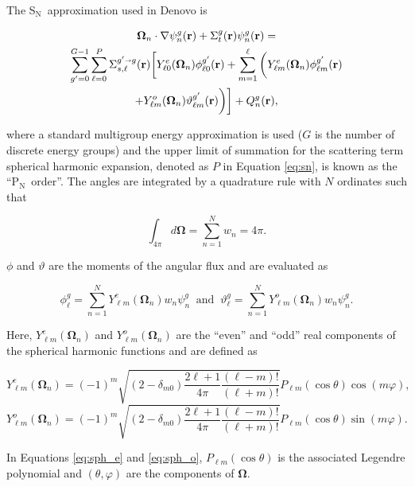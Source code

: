 \documentclass{article} %
\newcommand{\sa}{\shortrightarrow}
\newcommand{\bo}{\mathbf\Omega}
\newcommand{\vecr}{\textbf{r}}
\newcommand{\sn}{S$_\mathrm{N}$}
\newcommand{\pn}{P$_\mathrm{N}$}
\newcommand{\Ye}[2]{\ensuremath{Y^e_{#1}(\bo_#2)}}
\newcommand{\Yo}[2]{\ensuremath{Y^o_{#1}(\bo_#2)}}
\begin{document}
The \sn\ approximation used in Denovo is

\begin{multline}
\bo_n \cdot \nabla \psi_n^g(\vecr) + \Sigma_t^g(\vecr)\psi_n^g(\vecr) = \\
\sum_{g'=0}^{G-1}\sum_{\ell=0}^{P}\Sigma_{s,\ell}^{g'\sa g}(\vecr)
\bigg[\Ye{\ell 0}{n}\phi_{\ell 0}^{g'}(\vecr) + \sum_{m=1}^{\ell}
\bigg(\Ye{\ell m}{n}\phi_{\ell m}^{g'}(\vecr) \\
 + \Yo{\ell m}{n}\vartheta_{\ell m}^{g'}(\vecr)\bigg)\bigg]
+ Q_n^g(\vecr),
\label{eq:sn}
\end{multline}

\noindent where a standard multigroup energy approximation is used ($G$ is the 
number of discrete energy groups) and the 
upper limit of summation for the scattering term spherical harmonic expansion,
denoted as $P$ in Equation \ref{eq:sn}, is known as the ``\pn\ order''. The
angles are integrated by a quadrature rule with $N$ ordinates such that

\begin{equation}
\int_{4\pi} d\bo = \sum_{n=1}^{N}w_n = 4\pi.
\label{eq:quadrule}
\end{equation}

\noindent $\phi$ and $\vartheta$ are the moments of the angular flux and are
evaluated as

\begin{equation}
\phi_{\ell}^{g}=\sum_{n=1}^N \Ye{\ell m}{n}w_n\psi^{g}_{n}\
\text{ and }\
\vartheta_{\ell}^{g} = \sum_{n=1}^N \Yo{\ell m}{n}w_n\psi^{g}_{n}.
\label{sph_harm_exp}
\end{equation}

\noindent Here, $\Ye{\ell m}{n}$ and $\Yo{\ell m}{n}$ are the ``even'' and
``odd'' real components of the spherical harmonic functions and are defined as

\begin{equation}
\Ye{\ell m}{n} = (-1)^m\sqrt{(2-\delta_{m0})\frac{2\ell+1}{4\pi}
                       \frac{(\ell-m)!}{(\ell+m)!}}
                       P_{\ell m}(\cos\theta)\cos(m\varphi),
\label{eq:sph_e}
\end{equation}
\begin{equation}
\Yo{\ell m}{n} = (-1)^m\sqrt{(2-\delta_{m0})\frac{2\ell+1}{4\pi}
                       \frac{(\ell-m)!}{(\ell+m)!}}
                       P_{\ell m}(\cos\theta)\sin(m\varphi).
\label{eq:sph_o}
\end{equation}

\noindent In Equations \ref{eq:sph_e} and \ref{eq:sph_o},
$P_{\ell m}(\cos\theta)$ is the associated Legendre polynomial and
$(\theta,\varphi)$ are the components of $\bo$.
\end{document}
